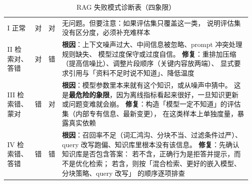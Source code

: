 \begin{table}[htbp]
\centering
\caption{RAG 失败模式诊断表（四象限）}
\label{tab:rag-diagnosis}
\small
\begin{tabularx}{\textwidth}{L{1.9cm} L{1.5cm} L{1.5cm} Y}
\toprule
{} &  &  &  \\
\midrule
I 正常 & 对 & 对 & 无问题。但要注意：如果评估集只覆盖这一类，
说明评估集没有区分度，必须补充难样本 \\
\addlinespace
II 检索对、答错 & 对 & 错 &
\textbf{根因}：上下文噪声过大、中间信息被忽略、prompt 冲突处理规则缺失、
模型过度保守或过度自信。
\textbf{修复}：重排加压缩（提高信噪比）、调整片段顺序（关键内容放两端）、
显式要求引用与「资料不足时说不知道」、降低温度 \\
\addlinespace
III 检索错、蒙对 & 错 & 对 &
\textbf{根因}：模型参数里本来就有这个知识，或从噪声中猜中。
这是\textbf{最危险的象限}，因为离线指标看起来很好，一旦知识更新或问题变难就会崩。
\textbf{修复}：构造「模型一定不知道」的评估集（内部专有信息、最新变更），
在这类样本上单独度量，暴露真实依赖 \\
\addlinespace
IV 检索错、答错 & 错 & 错 &
\textbf{根因}：召回率不足（词汇鸿沟、分块不当、过滤条件过严）、
query 改写跑偏、知识库里根本没有该信息。
\textbf{修复}：先确认知识库是否包含答案：
若不含，正确行为是拒答并提示，而不是优化检索；
若含，则按「混合检索、更好的嵌入模型、分块策略、query 改写」
的顺序逐项排查 \\
\bottomrule
\end{tabularx}
\end{table}

